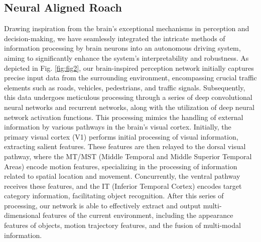 \subsection{Neural Aligned Roach}
\hspace{1pc}Drawing inspiration from the brain's exceptional mechanisms in perception and decision-making, we have seamlessly integrated the intricate methods of information processing by brain neurons into an autonomous driving system, aiming to significantly enhance the system's interpretability and robustness. As depicted in Fig. \ref{fig:fig2}, our brain-inspired perception network initially captures precise input data from the surrounding environment, encompassing crucial traffic elements such as roads, vehicles, pedestrians, and traffic signals. Subsequently, this data undergoes meticulous processing through a series of deep convolutional neural networks and recurrent networks, along with the utilization of deep neural network activation functions. This processing mimics the handling of external information by various pathways in the brain's visual cortex. Initially, the primary visual cortex (V1) performs initial processing of visual information, extracting salient features. These features are then relayed to the dorsal visual pathway, where the MT/MST (Middle Temporal and Middle Superior Temporal Areas) encode motion features, specializing in the processing of information related to spatial location and movement. Concurrently, the ventral pathway receives these features, and the IT (Inferior Temporal Cortex) encodes target category information, facilitating object recognition. After this series of processing, our network is able to effectively extract and output multi-dimensional features of the current environment, including the appearance features of objects, motion trajectory features, and the fusion of multi-modal information.

